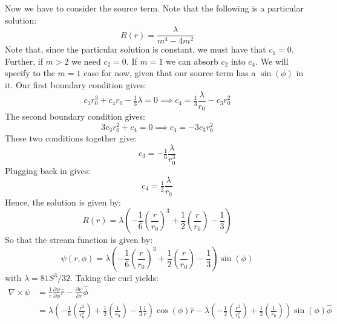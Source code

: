 \documentclass[reqno]{article}
\begin{document}
Now we have to consider the source term.
Note that the following is a particular solution:
\begin{equation}
  R(r) = \frac{\lambda}{m^4 - 4m^2}
\end{equation}
Note that, since the particular solution is constant, we must have that $c_1 = 0$.
Further, if $m > 2$ we need $c_2 = 0$.
If $m = 1$ we can absorb $c_2$ into $c_4$.
We will specify to the $m = 1$ case for now, given that our source term has a $\sin(\phi)$ in it.
Our first boundary condition gives:
\begin{equation}
  c_3 r_0^3 + c_4 r_0 -\tfrac13 \lambda = 0
  \implies
  c_4 = \tfrac13 \frac{\lambda}{r_0} - c_3 r_0^2
\end{equation}
The second boundary condition gives:
\begin{equation}
  3 c_3 r_0^2 + c_4 = 0
  \implies
  c_4 = - 3 c_3 r_0^2
\end{equation}
These two conditions together give:
\begin{equation}
  c_3 = -\tfrac16 \frac{\lambda}{r_0^3} 
\end{equation}
Plugging back in gives:
\begin{equation}
  c_4 = \tfrac12 \frac{\lambda}{r_0}
\end{equation}
Hence, the solution is given by:
\begin{equation}
  R(r) =
  \lambda \left(
  -\frac16 \left(\frac{r}{r_0}\right)^3
  + \frac12 \left(\frac{r}{r_0}\right)
  - \frac13
  \right)
\end{equation}
So that the stream function is given by:
\begin{equation}
  \psi(r, \phi) =
  \lambda \left(
  -\frac16 \left(\frac{r}{r_0}\right)^3
  + \frac12 \left(\frac{r}{r_0}\right)
  - \frac13
  \right)
  \sin(\phi)
\end{equation}
with $\lambda = 81 S^3 / 32$.
Taking the curl yields:
\begin{equation}
  \begin{split}
    \nabla \times \psi
    &= \frac{1}{r} \frac{\partial \psi}{\partial \phi} \hat{r}
    - \frac{\partial \psi}{\partial r} \hat{\phi} \\
    &= \lambda \left(
    -\frac16 \left(\frac{r^2}{r_0^3}\right)
    + \frac12 \left(\frac{1}{r_0}\right)
    - \frac13 \frac{1}{r}
    \right)
    \cos(\phi) \hat{r}
    - \lambda \left(
    -\frac12 \left(\frac{r^2}{r_0^3}\right)
    + \frac12 \left(\frac{1}{r_0}\right)
    \right)
    \sin(\phi) \hat{\phi} \\
  \end{split}
\end{equation}
\end{document}
